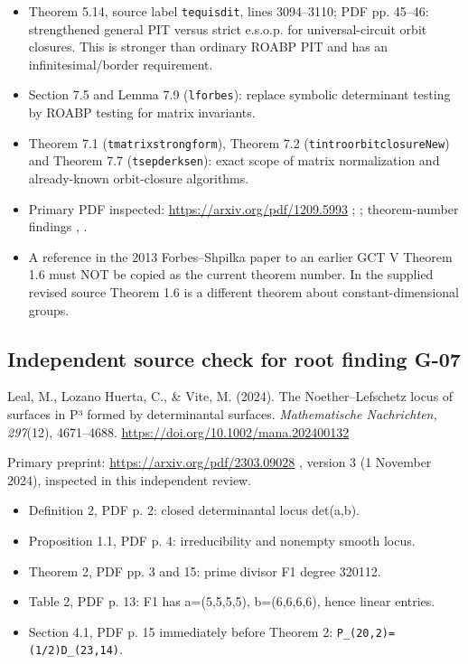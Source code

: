 \documentclass[11pt,a4paper]{article}
\providecommand{\tightlist}{\setlength{\itemsep}{0pt}\setlength{\parskip}{0pt}}
\theoremstyle{definition}\newtheorem{definition}{Definition}
\begin{document}
\begin{itemize}
\tightlist
\item
  Theorem 5.14, source label \nolinkurl{tequisdit}, lines 3094--3110; PDF
  pp. 45--46: strengthened general PIT versus strict e.s.o.p. for
  universal-circuit orbit closures. This is stronger than ordinary ROABP
  PIT and has an infinitesimal/border requirement.
\item
  Section 7.5 and Lemma 7.9 (\nolinkurl{lforbes}): replace symbolic
  determinant testing by ROABP testing for matrix invariants.
\item
  Theorem 7.1 (\nolinkurl{tmatrixstrongform}), Theorem 7.2
  (\nolinkurl{tintroorbitclosureNew}) and Theorem 7.7
  (\nolinkurl{tsepderksen}): exact scope of matrix normalization and
  already-known orbit-closure algorithms.
\item
  Primary PDF inspected: \url{https://arxiv.org/pdf/1209.5993} ; ;
  theorem-number findings , .
\item
  A reference in the 2013 Forbes--Shpilka paper to an earlier GCT V
  Theorem 1.6 must NOT be copied as the current theorem number. In the
  supplied revised source Theorem 1.6 is a different theorem about
  constant-dimensional groups.
\end{itemize}

\subsection{Independent source check for root finding
G-07}\label{independent-source-check-for-root-finding-g-07}

Leal, M., Lozano Huerta, C., \& Vite, M. (2024). The Noether--Lefschetz
locus of surfaces in P³ formed by determinantal surfaces.
\emph{Mathematische Nachrichten, 297}(12), 4671--4688.
\url{https://doi.org/10.1002/mana.202400132}

Primary preprint: \url{https://arxiv.org/pdf/2303.09028} , version 3 (1
November 2024), inspected in this independent review.

\begin{itemize}
\tightlist
\item
  Definition 2, PDF p. 2: closed determinantal locus det(a,b).
\item
  Proposition 1.1, PDF p. 4: irreducibility and nonempty smooth locus.
\item
  Theorem 2, PDF pp. 3 and 15: prime divisor F1 degree 320112.
\item
  Table 2, PDF p. 13: F1 has a=(5,5,5,5), b=(6,6,6,6), hence linear
  entries.
\item
  Section 4.1, PDF p. 15 immediately before Theorem 2:
  \nolinkurl{P_(20,2)=(1/2)D_(23,14)}.
\end{itemize}
\end{document}
